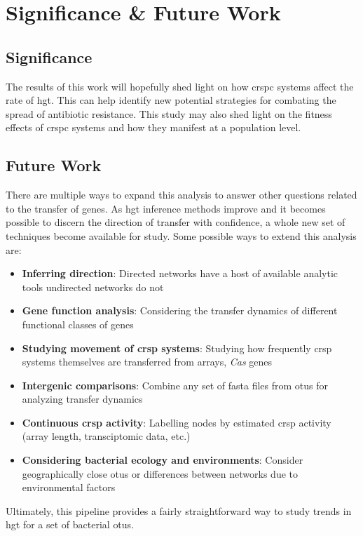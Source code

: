 \section{Significance \& Future Work}
\subsection{Significance}
The results of this work will hopefully shed light on how \ac{crspc} systems affect the rate of \ac{hgt}.
This can help identify new potential strategies for combating the spread of antibiotic resistance.
This study may also shed light on the fitness effects of \ac{crspc} systems and how they manifest at a population level.\par
\subsection{Future Work}
There are multiple ways to expand this analysis to answer other questions related to the transfer of genes.
As \ac{hgt} inference methods improve and it becomes possible to discern the direction of transfer with confidence, a whole new set of techniques become available for study.
Some possible ways to extend this analysis are:
\begin{itemize}
    \item \textbf{Inferring direction}: Directed networks have a host of available analytic tools undirected networks do not
    \item \textbf{Gene function analysis}: Considering the transfer dynamics of different functional classes of genes
    \item \textbf{Studying movement of \ac{crsp} systems}: Studying how frequently \ac{crsp} systems themselves are transferred from arrays, \textit{Cas} genes
    \item \textbf{Intergenic comparisons}: Combine any set of fasta files from \ac{otu}s for analyzing transfer dynamics
    \item \textbf{Continuous \ac{crsp} activity}: Labelling nodes by estimated \ac{crsp} activity (array length, transciptomic data, etc.)
    \item \textbf{Considering bacterial ecology and environments}: Consider geographically close \ac{otu}s or differences between networks due to environmental factors
\end{itemize}
Ultimately, this pipeline provides a fairly straightforward way to study trends in \ac{hgt} for a set of bacterial \ac{otu}s.
